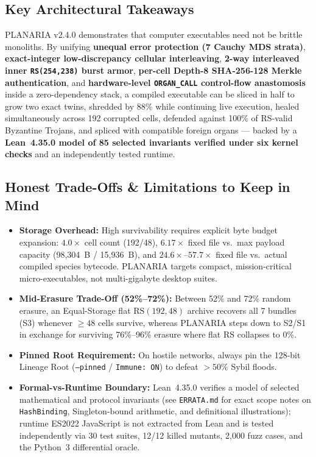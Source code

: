 \documentclass[10pt,letterpaper]{article}
\begin{document}
\subsection{Key Architectural Takeaways}
PLANARIA v2.4.0 demonstrates that computer executables need not be brittle monoliths. By unifying \textbf{unequal error protection (7 Cauchy MDS strata)}, \textbf{exact-integer low-discrepancy cellular interleaving}, \textbf{2-way interleaved inner \texttt{RS(254,238)} burst armor}, \textbf{per-cell Depth-8 SHA-256-128 Merkle authentication}, and \textbf{hardware-level \texttt{ORGAN\_CALL} control-flow anastomosis} inside a zero-dependency stack, a compiled executable can be sliced in half to grow two exact twins, shredded by 88\% while continuing live execution, healed simultaneously across 192 corrupted cells, defended against 100\% of RS-valid Byzantine Trojans, and spliced with compatible foreign organs --- backed by a \textbf{Lean~4.35.0 model of 85 selected invariants verified under six kernel checks} and an independently tested runtime.

\subsection{Honest Trade-Offs \& Limitations to Keep in Mind}
\begin{itemize}[leftmargin=1.5em, itemsep=1.5pt]
  \item \textbf{Storage Overhead:} High survivability requires explicit byte budget expansion: $4.0\times$ cell count (192/48), $6.17\times$ fixed file vs.\ max payload capacity (98,304~B / 15,936~B), and $24.6\times\text{--}57.7\times$ fixed file vs.\ actual compiled species bytecode. PLANARIA targets compact, mission-critical micro-executables, not multi-gigabyte desktop suites.
  \item \textbf{Mid-Erasure Trade-Off (52\%--72\%):} Between 52\% and 72\% random erasure, an Equal-Storage flat $\mathrm{RS}(192,48)$ archive recovers all 7 bundles (S3) whenever $\ge 48$ cells survive, whereas PLANARIA steps down to S2/S1 in exchange for surviving 76\%--96\% erasure where flat RS collapses to 0\%.
  \item \textbf{Pinned Root Requirement:} On hostile networks, always pin the 128-bit Lineage Root (\texttt{--pinned} / \texttt{Immune: ON}) to defeat $>50\%$ Sybil floods.
  \item \textbf{Formal-vs-Runtime Boundary:} Lean~4.35.0 verifies a model of selected mathematical and protocol invariants (see \texttt{ERRATA.md} for exact scope notes on \texttt{HashBinding}, Singleton-bound arithmetic, and definitional illustrations); runtime ES2022 JavaScript is not extracted from Lean and is tested independently via 30 test suites, 12/12 killed mutants, 2,000 fuzz cases, and the Python~3 differential oracle.
\end{itemize}
\end{document}
